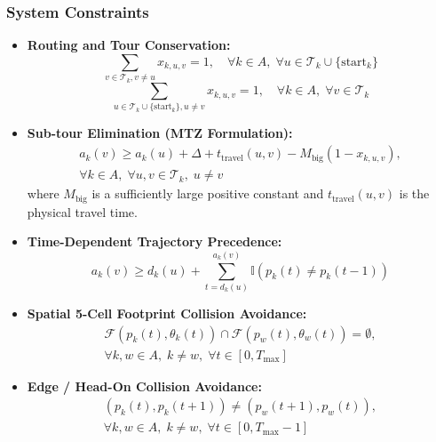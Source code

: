 \documentclass[journal]{IEEEtran}
\begin{document}
\subsubsection{System Constraints}
\begin{itemize}
    \item \textbf{Routing and Tour Conservation:}
    \begin{equation}
    \sum_{v \in \mathcal{T}_k, v \neq u} x_{k, u, v} = 1, \quad \forall k \in A, \; \forall u \in \mathcal{T}_k \cup \{\text{start}_k\}
    \end{equation}
    \begin{equation}
    \sum_{u \in \mathcal{T}_k \cup \{\text{start}_k\}, u \neq v} x_{k, u, v} = 1, \quad \forall k \in A, \; \forall v \in \mathcal{T}_k
    \end{equation}

    \item \textbf{Sub-tour Elimination (MTZ Formulation):}
    \begin{multline}
    a_k(v) \ge a_k(u) + \Delta + t_{\text{travel}}(u, v) - M_{\text{big}}(1 - x_{k, u, v}), \\
    \forall k \in A, \; \forall u, v \in \mathcal{T}_k, \; u \neq v
    \end{multline}
    where $M_{\text{big}}$ is a sufficiently large positive constant and $t_{\text{travel}}(u, v)$ is the physical travel time.

    \item \textbf{Time-Dependent Trajectory Precedence:}
    \begin{equation}
    a_k(v) \ge d_k(u) + \sum_{t = d_k(u)}^{a_k(v)} \mathbb{I}(p_k(t) \neq p_k(t-1))
    \end{equation}

    \item \textbf{Spatial 5-Cell Footprint Collision Avoidance:}
    \begin{multline}
    \mathcal{F}(p_k(t), \theta_k(t)) \cap \mathcal{F}(p_w(t), \theta_w(t)) = \emptyset, \\
    \forall k, w \in A, \; k \neq w, \; \forall t \in [0, T_{\max}]
    \end{multline}

    \item \textbf{Edge / Head-On Collision Avoidance:}
    \begin{multline}
    (p_k(t), p_k(t+1)) \neq (p_w(t+1), p_w(t)), \\
    \forall k, w \in A, \; k \neq w, \; \forall t \in [0, T_{\max}-1]
    \end{multline}


\end{itemize}
\end{document}
